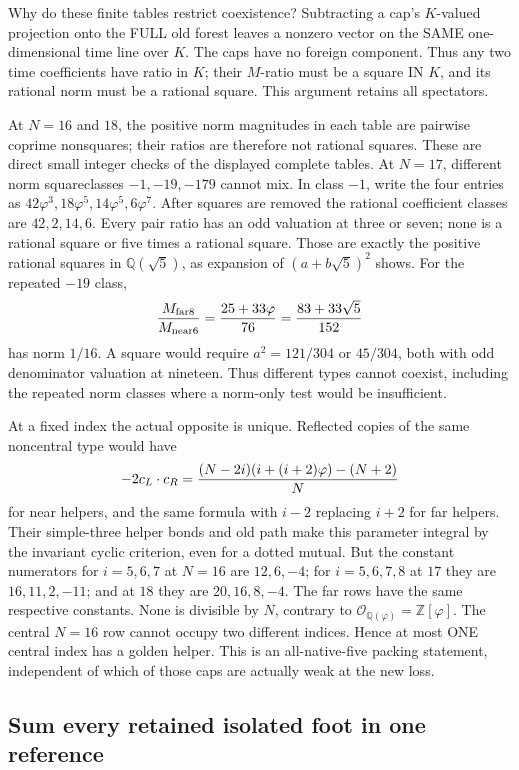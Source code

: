 Why do these finite tables restrict coexistence?
Subtracting a cap's \(K\)-valued projection onto the FULL old
forest leaves a nonzero vector on the SAME one-dimensional
time line over \(K\).
The caps have no foreign component.
Thus any two time coefficients have ratio in \(K\);
their \(M\)-ratio must be a square IN \(K\), and its rational
norm must be a rational square.
This argument retains all spectators.

At \(N=16\) and \(18\), the positive norm magnitudes in each
table are pairwise coprime nonsquares; their ratios are therefore
not rational squares.  These are direct small integer checks of
the displayed complete tables.
At \(N=17\), different norm squareclasses \(-1,-19,-179\)
cannot mix.
In class \(-1\), write the four entries as
\(42\varphi^3,18\varphi^5,14\varphi^5,6\varphi^7\).
After squares are removed the rational coefficient classes are
\(42,2,14,6\).
Every pair ratio has an odd valuation at three or seven;
none is a rational square or five times a rational square.
Those are exactly the positive rational squares in
\(\mathbb Q(\sqrt5)\), as expansion of
\((a+b\sqrt5)^2\) shows.
For the repeated \(-19\) class,
\[
 {M_{\rm far8}\over M_{\rm near6}}
   ={25+33\varphi\over76}={83+33\sqrt5\over152}
\]
has norm \(1/16\).
A square would require
\(a^2=121/304\) or \(45/304\), both with odd denominator
valuation at nineteen.
Thus different types cannot coexist, including the repeated
norm classes where a norm-only test would be insufficient.

At a fixed index the actual opposite is unique.
Reflected copies of the same noncentral type would have
\[
 -2c_L\cdot c_R=
 { (N-2i)(i+(i+2)\varphi)-(N+2)\over N}
\]
for near helpers, and the same formula with \(i-2\) replacing
\(i+2\) for far helpers.
Their simple-three helper bonds and old path make this
parameter integral by the invariant cyclic criterion, even for
a dotted mutual.
But the constant numerators for \(i=5,6,7\) at \(N=16\) are
\(12,6,-4\); for \(i=5,6,7,8\) at \(17\) they are
\(16,11,2,-11\); and at \(18\) they are \(20,16,8,-4\).
The far rows have the same respective constants.
None is divisible by \(N\), contrary to
\(\mathcal O_{\mathbb Q(\varphi)}=\mathbb Z[\varphi]\).
The central \(N=16\) row cannot occupy two different indices.
Hence at most ONE central index has a golden helper.
This is an all-native-five packing statement, independent of
which of those caps are actually weak at the new loss.

\subsection{Sum every retained isolated foot in one reference}
\label{app:arithsummedfeet}

